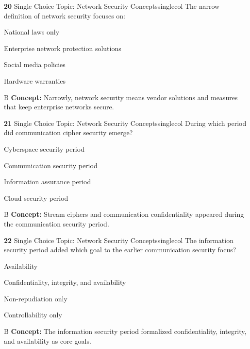 \documentclass[10pt,a4paper]{article}
\begin{document}
\begin{qcard}{\color{white}\textbf{20} \hfill \small Single Choice \textbar{} Topic: Network Security Concepts}{singlecol}
The narrow definition of network security focuses on:

\begin{qoptions}
\item National laws only
\item Enterprise network protection solutions
\item Social media policies
\item Hardware warranties
\end{qoptions}
\begin{explainbox}{B}
\textbf{Concept:} Narrowly, network security means vendor solutions and measures that keep enterprise networks secure.
\end{explainbox}
\end{qcard}

\begin{qcard}{\color{white}\textbf{21} \hfill \small Single Choice \textbar{} Topic: Network Security Concepts}{singlecol}
During which period did communication cipher security emerge?

\begin{qoptions}
\item Cyberspace security period
\item Communication security period
\item Information assurance period
\item Cloud security period
\end{qoptions}
\begin{explainbox}{B}
\textbf{Concept:} Stream ciphers and communication confidentiality appeared during the communication security period.
\end{explainbox}
\end{qcard}

\begin{qcard}{\color{white}\textbf{22} \hfill \small Single Choice \textbar{} Topic: Network Security Concepts}{singlecol}
The information security period added which goal to the earlier communication security focus?

\begin{qoptions}
\item Availability
\item Confidentiality, integrity, and availability
\item Non-repudiation only
\item Controllability only
\end{qoptions}
\begin{explainbox}{B}
\textbf{Concept:} The information security period formalized confidentiality, integrity, and availability as core goals.
\end{explainbox}
\end{qcard}
\end{document}
